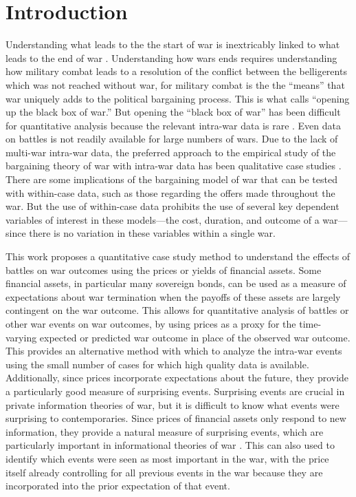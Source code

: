 





\section{Introduction}
\label{sec:introduction}

Understanding what leads to the the start of war is inextricably linked to what leads to the end of war \parencite[x]{Blainey1988}.
Understanding how wars ends requires understanding how military combat leads to a resolution of the conflict between the belligerents which was not reached without war, for military combat is the the ``means'' that war uniquely adds to the political bargaining process.
This is what  \textcite{Gartner1998} calls ``opening up the black box of war.'' 
But opening the ``black box of war'' has been difficult for quantitative analysis because the relevant intra-war data is rare \parencites{Reiter2003}{Reiter2009}.
Even data on battles is not readily available for large numbers of wars.
Due to the lack of multi-war intra-war data, the preferred approach to the empirical study of the bargaining theory of war with intra-war data has been qualitative case studies \parencites{Reiter2003}[][Chapter 9]{Reiter2009}. 
There are some implications of the bargaining model of war that can be tested with within-case data, such as those regarding the offers made throughout the war.
But the use of within-case data prohibits the use of several key dependent variables of interest in these models---the cost, duration, and outcome of a war---since there is no variation in these variables within a single war.

This work proposes a quantitative case study method to understand the effects of battles on war outcomes using the prices or yields of financial assets.
Some financial assets, in particular many sovereign bonds, can be used as a measure of expectations about war termination when the payoffs of these assets are largely contingent on the war outcome.
This allows for quantitative analysis of battles or other war events on war outcomes, by using prices as a proxy for the time-varying expected or predicted war outcome in place of the observed war outcome.
This provides an alternative method with which to analyze the intra-war events using the small number of cases for which high quality data is available.
Additionally, since prices incorporate expectations about the future, they provide a particularly good measure of surprising events. 
Surprising events are crucial in private information theories of war, but it is difficult to know what events were surprising to contemporaries.
Since prices of financial assets only respond to new information, they provide a natural measure of surprising events, which are particularly important in informational theories of war \parencite{Shirkey2009a}.
This can also used to identify which events were seen as most important in the war, with the price itself already controlling for all previous events in the war because they are incorporated into the prior expectation of that event.

